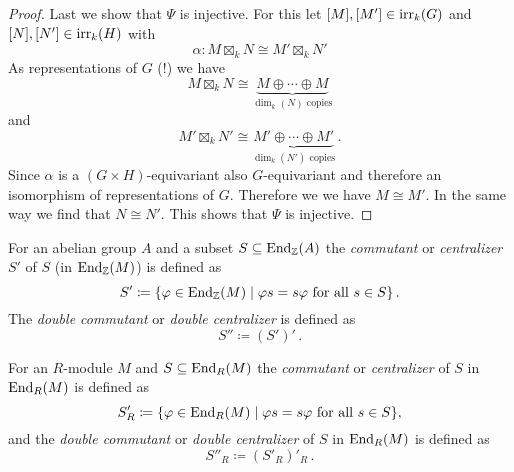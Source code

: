 \begin{proof}
  Last we show that $\Psi$ is injective.
  For this let $[M], [M'] \in \operatorname{irr}_k(G)$ and $[N], [N'] \in \operatorname{irr}_k(H)$ with
  \[
            \alpha
    \colon  M  \boxtimes_k N
    \cong   M' \boxtimes_k N'
  \]
  As representations of $G$ (!) we have
  \[
          M \boxtimes_k N
    \cong \underbrace{ M \oplus \dotsb \oplus M }_{ \dim_k(N) \text{ copies} }
  \]
  and
  \[
          M' \boxtimes_k N'
    \cong \underbrace{ M' \oplus \dotsb \oplus M' }_{ \dim_k(N') \text{ copies} }\,.
  \]
  Since $\alpha$ is a $(G \times H)$-equivariant also $G$-equivariant and therefore an isomorphism of representations of $G$.
  Therefore we we have $M \cong M'$.
  In the same way we find that $N \cong N'$.
  This shows that $\Psi$ is injective.
\end{proof}


\begin{definition}
  For an abelian group $A$ and a subset $S \subseteq \operatorname{End}_{\mathbb{Z}}(A)$ the \emph{commutant} or \emph{centralizer} $S'$ of $S$ (in $\operatorname{End}_{\mathbb{Z}}(M)$) is defined as
  \[
              S'
    \coloneqq \{
                \varphi \in \operatorname{End}_{\mathbb{Z}}(M)
              \mid
                \varphi s = s \varphi
                \text{ for all }
                s \in S
              \} \,.
  \]
  The \emph{double commutant} or \emph{double centralizer} is defined as
  \[
    S'' \coloneqq (S')' \,.
  \]
  
  For an $R$-module $M$ and $S \subseteq \operatorname{End}_R(M)$ the \emph{commutant} or \emph{centralizer} of $S$ in $\operatorname{End}_R(M)$ is defined as
  \[
              S'_R
    \coloneqq \{
                \varphi \in \operatorname{End}_R(M)
              \mid
                \varphi s = s \varphi
                \text{ for all }
                s \in S
              \},
  \]
  and the \emph{double commutant} or \emph{double centralizer} of $S$ in $\operatorname{End}_R(M)$ is defined as
  \[
    S''_R \coloneqq (S'_R)'_R \,.
  \]
\end{definition}


